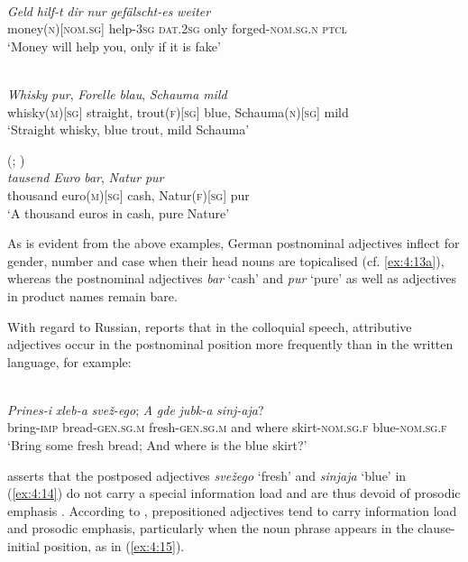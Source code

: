 \ea

\ea{\label{ex:4:13a}}
\citep[234]{eisenberg-satz-1999}\\
\gll \textit{Geld} \textit{hilf-t} \textit{dir} \textit{nur} \textit{gefälscht-es} \textit{weiter}\\
	money(\textsc{n})[\textsc{nom.sg}] help-\textsc{3sg} \textsc{dat.2sg} only forged-\textsc{nom.sg.n} \textsc{ptcl}\\
\glt `Money will help you, only if it is fake'

\ex{\label{ex:4:13b}}
\citep[64, 78]{duerscheid-2002}\\
\gll \textit{Whisky} \textit{pur}, \textit{Forelle} \textit{blau}, \textit{Schauma} \textit{mild}\\
	whisky(\textsc{m})[\textsc{sg}] straight, trout(\textsc{f})[\textsc{sg}] blue, Schauma(\textsc{n})[\textsc{sg}] mild\\
\glt `Straight whisky, blue trout, mild Schauma'

\ex{\label{ex:4:13c}}
(\citealt[350]{duden-2009}; \citealt[67]{duerscheid-2002})\\
\gll \textit{tausend} \textit{Euro} \textit{bar}, \textit{Natur} \textit{pur}\\
	thousand euro(\textsc{m})[\textsc{sg}] cash, Natur(\textsc{f})[\textsc{sg}] pur\\
\glt `A thousand euros in cash, pure Nature'
\z
\z

\noindent As is evident from the above examples, German postnominal adjectives inflect for gender, number and case when their head nouns are topicalised (cf. \ref{ex:4:13a}), whereas the postnominal adjectives \textit{bar} `cash' and \textit{pur} `pure' as well as adjectives in product names remain bare.

With regard to Russian, \citet[149]{zemskaja} reports that in the colloquial speech, attributive adjectives occur in the postnominal position more frequently than in the written language, for example: 

\ea
\label{ex:4:14}
\citep[152]{zemskaja}\\
\gll \textit{Prines-i} \textit{xleb-a} \textit{svež-ego}; \textit{A} \textit{gde} \textit{jubk-a} \textit{sinj-aja}?\\
	bring-\textsc{imp} bread-\textsc{gen.sg.m} fresh-\textsc{gen.sg.m} and where skirt-\textsc{nom.sg.f} blue-\textsc{nom.sg.f}\\
\glt `Bring some fresh bread; And where is the blue skirt?'
\z

\noindent \citet{zemskaja} asserts that the postposed adjectives \textit{svežego} `fresh' and \textit{sinjaja} `blue' in (\ref{ex:4:14}) do not carry a special information load and are thus devoid of prosodic emphasis \citep[cf.][208--212]{lapteva}. According to \citet{zemskaja}, prepositioned adjectives tend to carry information load and prosodic emphasis, particularly when the noun phrase appears in the clause-initial position, as in (\ref{ex:4:15}).

